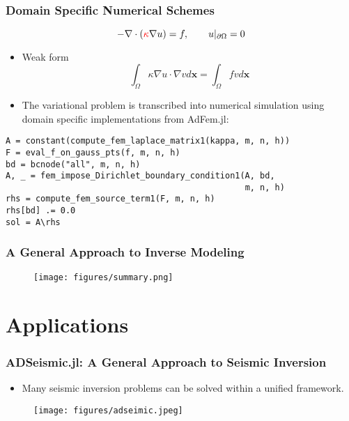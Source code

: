 \documentclass[usenames,dvipsnames]{beamer}
\begin{document}
\begin{frame}[fragile]
	\frametitle{Domain Specific Numerical Schemes}
	
	\begin{equation*}
		-\nabla \cdot (\textcolor{red}{\kappa} \nabla u) = f, \qquad u|_{\partial \Omega} = 0 
	\end{equation*}
	
	\begin{itemize}
		\item Weak form 
		\begin{equation*}
			\int_\Omega \kappa \nabla u \cdot \nabla v d\mathbf{x} = \int_\Omega f v d\mathbf{x}
		\end{equation*}
		\item The variational problem is transcribed into numerical simulation using domain specific implementations from AdFem.jl:
	\end{itemize}
	{\small
	\begin{lstlisting}
A = constant(compute_fem_laplace_matrix1(kappa, m, n, h))
F = eval_f_on_gauss_pts(f, m, n, h)
bd = bcnode("all", m, n, h)
A, _ = fem_impose_Dirichlet_boundary_condition1(A, bd, 
                                                m, n, h)
rhs = compute_fem_source_term1(F, m, n, h)
rhs[bd] .= 0.0
sol = A\rhs\end{lstlisting}
}
\end{frame}



\begin{frame}
	\frametitle{A General Approach to Inverse Modeling}
	\begin{figure}[hbt]
  \texttt{[image: figures/summary.png]}
\end{figure}

\end{frame}


\section{Applications}



\begin{frame}
	\frametitle{ADSeismic.jl: A General Approach to Seismic Inversion}
	\begin{itemize}
		\item Many seismic inversion problems can be solved within a unified framework. 
	\end{itemize}
	\begin{figure}[hbt]
  \texttt{[image: figures/adseimic.jpeg]}
\end{figure}
	
\end{frame}
\end{document}
